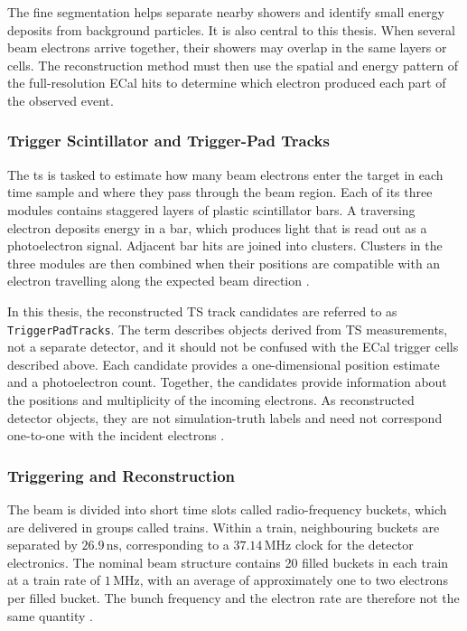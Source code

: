 The fine segmentation helps separate nearby showers and identify small
energy deposits from background particles. It is also central to this
thesis. When several beam electrons arrive together, their showers may
overlap in the same layers or cells. The reconstruction method must then use
the spatial and energy pattern of the full-resolution ECal hits to determine
which electron produced each part of the observed event.

\subsubsection{Trigger Scintillator and Trigger-Pad Tracks}

The \gls{ts} is tasked to estimate how many beam electrons enter the target in each
time sample and where they pass through the beam region. Each of its three
modules contains staggered layers of plastic scintillator bars. A traversing
electron deposits energy in a bar, which produces light that is read out as
a photoelectron signal. Adjacent bar hits are joined into clusters. Clusters
in the three modules are then combined when their positions are compatible
with an electron travelling along the expected beam direction
\cite{ldmx2025-overview}.

In this thesis, the reconstructed TS track candidates are referred to as
\texttt{TriggerPadTracks}. The term describes objects derived from TS
measurements, not a separate detector, and it should not be confused with the
ECal trigger cells described above. Each candidate provides a
one-dimensional position estimate and a photoelectron count. Together, the
candidates provide information about the positions and multiplicity of the
incoming electrons. As reconstructed detector objects, they are not
simulation-truth labels and need not correspond one-to-one with the incident
electrons \cite{ldmx2025-overview}.

\subsubsection{Triggering and Reconstruction}

The beam is divided into short time slots called radio-frequency buckets,
which are delivered in groups called trains. Within a train, neighbouring
buckets are separated by \(26.9\,\mathrm{ns}\), corresponding to a
\(37.14\,\mathrm{MHz}\) clock for the detector electronics. The nominal beam
structure contains 20 filled buckets in each train at a train rate of
\(1\,\mathrm{MHz}\), with an average of approximately one to two electrons
per filled bucket. The bunch frequency and the electron rate are therefore
not the same quantity \cite{ldmx2025-overview}.

